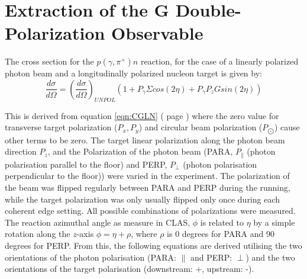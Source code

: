\section{Extraction of the G Double-Polarization Observable} \label{ch:extract_G}
The cross section for the $p(\gamma,\pi^+)n$ reaction, for the case of a linearly polarized photon beam and a longitudinally polarized nucleon target is given by:
\begin{equation}
  \frac{d\sigma}{d\Omega} = \left(\frac{d\sigma}{d\Omega}\right)_{UNPOL}  \left( 1 + P_{\gamma}\Sigma cos(2\eta) + P_{\gamma} P_z G sin(2\eta) \right)
  \label{eqn:extract_G_S}
\end{equation}

This is derived from equation \ref{eqn:CGLN} ( page \pageref{eqn:CGLN}) where the zero value for transverse target polarization ($P_x , P_y$) and circular beam polarization ($P_{\bigodot}$) cause other terms to be zero. The target linear polarization along the photon beam direction $P_z$, and the Polarization of the photon beam (PARA, $P_{\parallel}$ (photon polarisation parallel to the floor) and PERP, $P_{\perp}$ (photon polarisation perpendicular to the floor)) were varied in the experiment. The polarization of the beam was flipped regularly between PARA and PERP during the running, while the target polarization was only usually flipped only once during each coherent edge setting. All possible combinations of polarizations were measured. The reaction azimuthal angle as measure in CLAS, $\phi$ is related to $\eta$ by a simple rotation along the $z$-axis $\phi=\eta+\rho$, where $\rho$ is 0 degrees for PARA and 90 degrees for PERP. From this, the following equations are derived utilising the two orientations of the photon polarisation (PARA: $\parallel$ and PERP: $\perp$) and the two orientations of the target polarisation (downstream: +, upstream: -).


